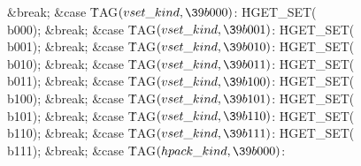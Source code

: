 \&{break};\7
\4\&{case} \.{TAG}${}(\index{vset kind+\\{vset\_kind}}\\{vset\_kind},\39\\{b000}){}$:\5
\.{HGET\_SET}(\\{b000});\5
\&{break};\6
\4\&{case} \.{TAG}${}(\index{vset kind+\\{vset\_kind}}\\{vset\_kind},\39\\{b001}){}$:\5
\.{HGET\_SET}(\\{b001});\5
\&{break};\6
\4\&{case} \.{TAG}${}(\index{vset kind+\\{vset\_kind}}\\{vset\_kind},\39\\{b010}){}$:\5
\.{HGET\_SET}(\\{b010});\5
\&{break};\6
\4\&{case} \.{TAG}${}(\index{vset kind+\\{vset\_kind}}\\{vset\_kind},\39\\{b011}){}$:\5
\.{HGET\_SET}(\\{b011});\5
\&{break};\6
\4\&{case} \.{TAG}${}(\index{vset kind+\\{vset\_kind}}\\{vset\_kind},\39\\{b100}){}$:\5
\.{HGET\_SET}(\\{b100});\5
\&{break};\6
\4\&{case} \.{TAG}${}(\index{vset kind+\\{vset\_kind}}\\{vset\_kind},\39\\{b101}){}$:\5
\.{HGET\_SET}(\\{b101});\5
\&{break};\6
\4\&{case} \.{TAG}${}(\index{vset kind+\\{vset\_kind}}\\{vset\_kind},\39\\{b110}){}$:\5
\.{HGET\_SET}(\\{b110});\5
\&{break};\6
\4\&{case} \.{TAG}${}(\index{vset kind+\\{vset\_kind}}\\{vset\_kind},\39\\{b111}){}$:\5
\.{HGET\_SET}(\\{b111});\5
\&{break};\7
\4\&{case} \.{TAG}${}(\index{hpack kind+\\{hpack\_kind}}\\{hpack\_kind},\39\\{b000}){}$:\5

